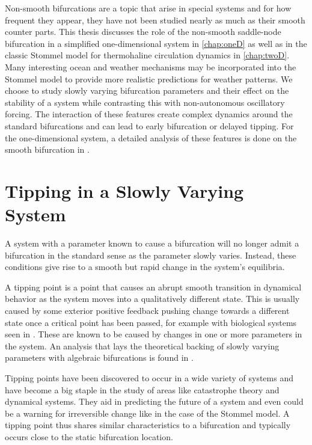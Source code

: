 Non-smooth bifurcations are a topic that arise in special systems and for how frequent they appear, they have not been studied nearly as much as their smooth counter parts. This thesis discusses the role of the non-smooth saddle-node bifurcation in a simplified one-dimensional system in \autoref{chap:oneD} as well as in the classic Stommel model for thermohaline circulation dynamics in \autoref{chap:twoD}. Many interesting ocean and weather mechanisms may be incorporated into the Stommel model to provide more realistic predictions for weather patterns. We choose to study slowly varying bifurcation parameters and their effect on the stability of a system while contrasting this with non-autonomous oscillatory forcing. The interaction of these features create complex dynamics around the standard bifurcations and can lead to early bifurcation or delayed tipping. For the one-dimensional system, a detailed analysis of these features is done on the smooth bifurcation in \cite{zhu2015tipping}.

\section*{Tipping in a Slowly Varying System}
A system with a parameter known to cause a bifurcation will no longer admit a bifurcation in the standard sense as the parameter slowly varies. Instead, these conditions give rise to a smooth but rapid change in the system's equilibria.

A tipping point is a point that causes an abrupt smooth transition in dynamical behavior as the system moves into a qualitatively different state. This is usually caused by some exterior positive feedback pushing change towards a different state once a critical point has been passed, for example with biological systems seen in \cite{angeli2004detection}. These are known to be caused by changes in one or more parameters in the system. An analysis that lays the theoretical backing of slowly varying parameters with algebraic bifurcations is found in \cite{haberman1979slowly}.

Tipping points have been discovered to occur in a wide variety of systems and have become a big staple in the study of areas like catastrophe theory and dynamical systems. They aid in predicting the future of a system and even could be a warning for irreversible change like in the case of the Stommel model. A tipping point thus shares similar characteristics to a bifurcation and typically occurs close to the static bifurcation location.

